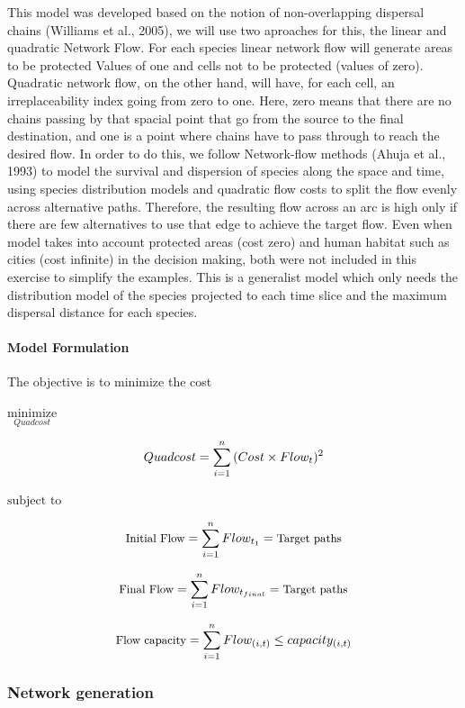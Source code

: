 \documentclass[]{article}
\let\oldparagraph\paragraph
\renewcommand{\paragraph}[1]{\oldparagraph{#1}\mbox{}}
\begin{document}
This model was developed based on the notion of non-overlapping dispersal chains (Williams et al., 2005), we will use two aproaches for this, the linear and quadratic Network Flow. For each species linear network flow will generate areas to be protected Values of one and cells not to be protected (values of zero). Quadratic network flow, on the other hand, will have, for each cell, an irreplaceability index going from zero to one. Here, zero means that there are no chains passing by that spacial point that go from the source to the final destination, and one is a point where chains have to pass through to reach the desired flow.
In order to do this, we follow Network-flow methods (Ahuja et al., 1993) to model the survival and dispersion of species along the space and time, using species distribution models and quadratic flow costs to split the flow evenly across alternative paths. Therefore, the resulting flow across an arc is high only if there are few alternatives to use that edge to achieve the target flow.
Even when model takes into account protected areas (cost zero) and human habitat such as cities (cost infinite) in the decision making, both were not included in this exercise to simplify the examples. This is a generalist model which only needs the distribution model of the species projected to each time slice and the maximum dispersal distance for each species.

\hypertarget{model-formulation}{%
\paragraph{Model Formulation}\label{model-formulation}}

The objective is to minimize the cost

\(\underset{Quadcost}{\text{minimize}}\)

\[\small Quadcost =  \sum_{i=1}^n{(Cost\times Flow_t)^2}\]

\(\text{subject to}\)

\[\small \text{Initial Flow} = \sum_{i=1}^n{Flow_{t_1}} = \text{Target paths}\]

\[\small \text{Final Flow} = \sum_{i=1}^n{Flow_{t_{final}}} = \text{Target paths}\]

\[\small \text{Flow capacity} = \sum_{i=1}^n{Flow_{(i,t)}} \leq capacity_{(i,t)}\]

\hypertarget{network-generation}{%
\subsubsection{Network generation}\label{network-generation}}
\end{document}
